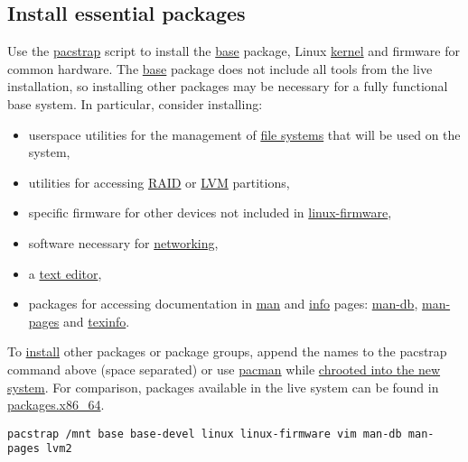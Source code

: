 \documentclass[12pt,A4]{article}
\begin{document}
\subsection{Install essential packages}
Use the \href{https://projects.archlinux.org/arch-install-scripts.git/tree/pacstrap.in}{pacstrap} script to install the \href{https://www.archlinux.org/packages/?name=base}{base} package, Linux \href{https://wiki.archlinux.org/index.php/Kernel}{kernel} and firmware for common hardware.
The \href{https://www.archlinux.org/packages/?name=base}{base} package does not include all tools from the live installation, so installing other packages may be necessary for a fully functional base system. In particular, consider installing:
\begin{itemize}
    \item userspace utilities for the management of \href{https://wiki.archlinux.org/index.php/File_systems}{file systems} that will be used on the system,
    \item utilities for accessing \href{https://wiki.archlinux.org/index.php/RAID}{RAID} or \href{https://wiki.archlinux.org/index.php/LVM}{LVM} partitions,
    \item specific firmware for other devices not included in \href{https://www.archlinux.org/packages/?name=linux-firmware}{linux-firmware},
    \item software necessary for \href{https://wiki.archlinux.org/index.php/Networking}{networking},
    \item a \href{https://wiki.archlinux.org/index.php/Text_editor}{text editor},
\item packages for accessing documentation in \href{https://wiki.archlinux.org/index.php/Man}{man} and \href{https://wiki.archlinux.org/index.php/Info}{info} pages: \href{https://www.archlinux.org/packages/?name=man-db}{man-db}, \href{https://www.archlinux.org/packages/?name=man-pages}{man-pages} and \href{https://www.archlinux.org/packages/?name=texinfo}{texinfo}.
\end{itemize}
    
\noindent To \href{https://wiki.archlinux.org/index.php/Install}{install} other packages or package groups, append the names to the pacstrap command above (space separated) or use \href{https://wiki.archlinux.org/index.php/Pacman}{pacman} while \href{https://wiki.archlinux.org/index.php/Installation_guide#Chroot}{chrooted into the new system}. For comparison, packages available in the live system can be found in \href{https://projects.archlinux.org/archiso.git/tree/configs/releng/packages.x86_64}{packages.x86\_64}.
\begin{verbatim}
pacstrap /mnt base base-devel linux linux-firmware vim man-db man-pages lvm2
\end{verbatim}
\end{document}
